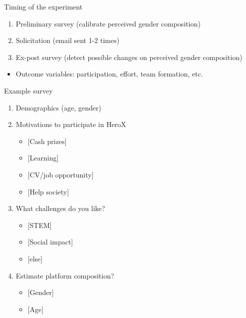 \begin{frame}{Timing of the experiment}

\begin{enumerate}
\def\labelenumi{\arabic{enumi}.}
\tightlist
\item
  Preliminary survey (calibrate perceived gender composition)
\item
  Solicitation (email sent 1-2 times)
\item
  Ex-post survey (detect possible changes on perceived gender
  composition)
\end{enumerate}

\begin{itemize}
\tightlist
\item
  Outcome variables: participation, effort, team formation, etc.
\end{itemize}

\end{frame}

\begin{frame}{Example survey}

\begin{enumerate}
\def\labelenumi{\arabic{enumi}.}
\tightlist
\item
  Demographics (age, gender)
\item
  Motivations to participate in HeroX

  \begin{itemize}
  \tightlist
  \item
    {[}Cash prizes{]}
  \item
    {[}Learning{]}
  \item
    {[}CV/job opportunity{]}
  \item
    {[}Help society{]}
  \end{itemize}
\item
  What challenges do you like?

  \begin{itemize}
  \tightlist
  \item
    {[}STEM{]}
  \item
    {[}Social impact{]}
  \item
    {[}else{]}
  \end{itemize}
\item
  Estimate platform composition?

  \begin{itemize}
  \tightlist
  \item
    {[}Gender{]}
  \item
    {[}Age{]}
  \end{itemize}
\end{enumerate}

\end{frame}

